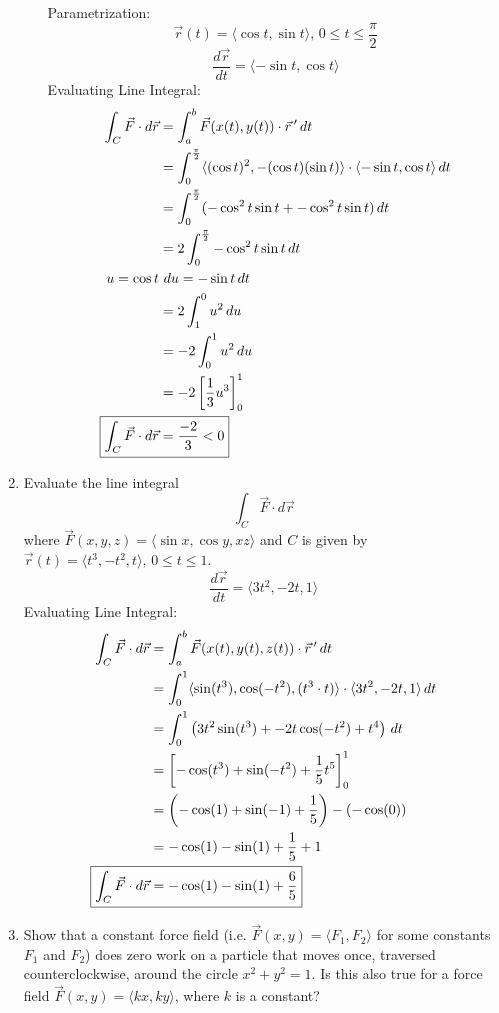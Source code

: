 \documentclass{article}
\begin{document}
\begin{enumerate}
\begin{enumerate}[(a)]
Parametrization: 
        $$\Vec{r}(t)=\langle \cos t, \sin t \rangle,\, 0\le t\le \frac{\pi}{2}$$
        $$\frac{d\Vec{r}}{dt}=\langle -\sin t, \cos t\rangle$$
Evaluating Line Integral: 
        \begin{align*}
        \int_C \Vec{F}\cdot d\Vec{r}&=\int_a^b \Vec{F}(x(t),y(t))\cdot \Vec{r}\,'\,dt\\
        &=\int_0^\frac{\pi}{2} \langle (\cos t)^2, -(\cos t)(\sin t)\rangle \cdot \langle -\sin t, \cos t\rangle \, dt\\
        &=\int_0^\frac{\pi}{2} (-\cos^2 t\sin t+ -\cos^2 t\sin t )\, dt\\
        &=2\int_0^\frac{\pi}{2} -\cos^2 t\sin t\,dt\\
        u=\cos t &\,\,du=-\sin t \, dt\\
        &=2\int_1^0 u^2 \,du\\
        &=-2\int_0^1 u^2 \, du\\
        &=-2\left[\frac{1}{3}u^3\right]_0^1\\
        \Aboxed{\int_C \Vec{F}\cdot d\Vec{r} & =\frac{-2}{3}<0}\\
        \end{align*}       

    \end{enumerate}
    \item Evaluate the line integral $$\int_C \Vec{F}\cdot d\Vec{r}$$ where $\Vec{F}(x,y,z)=\langle \sin x,\cos y, xz \rangle$ and $C$ is given by $\Vec{r}(t)=\langle t^3,-t^2,t\rangle, \, 0\le t \le 1$. %
    $$\frac{d\Vec{r}}{dt}=\langle 3t^2, -2t, 1\rangle$$
Evaluating Line Integral: 
\begin{align*}
    \int_C\Vec{F}\cdot d\Vec{r} &=\int_a^b \Vec{F}(x(t),y(t),z(t))\cdot \Vec{r}\,'\,dt\\
    &=\int_0^1 \langle \sin(t^3),\cos(-t^2),(t^3\cdot t)\rangle \cdot \langle 3t^2, -2t, 1\rangle\,dt\\
    &=\int_0^1  \left(3t^2\sin(t^3)+-2t\cos(-t^2)+t^4\right)\,dt\\
    &=\left[-\cos (t^3)+\sin(-t^2)+\frac{1}{5}t^5\right]_0^1\\
    &=\left(-\cos (1)+\sin(-1)+\frac{1}{5}\right)-\left(-\cos (0)\right)\\
    &=-\cos (1)-\sin(1)+\frac{1}{5}+1\\
\Aboxed{\int_C\Vec{F}\cdot d\Vec{r} &=-\cos (1)-\sin(1)+\frac{6}{5}}\\
\end{align*}
    \item Show that a constant force field (i.e. $\Vec{F}(x,y)=\langle F_1,F_2\rangle$ for some constants $F_1$ and $F_2$) does zero work on a particle that moves once, traversed counterclockwise, around the circle $x^2 + y^2=1$. Is this also true for a force field $\Vec{F}(x,y)=\langle kx,ky \rangle$, where $k$ is a constant?


\end{enumerate}
\end{document}
